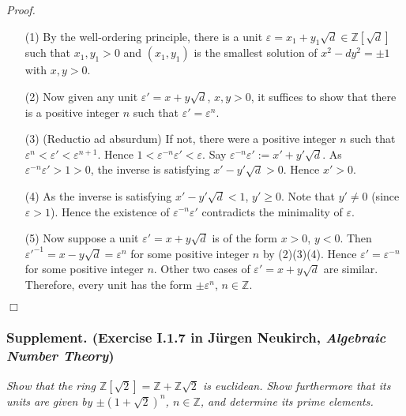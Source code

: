 \documentclass{article}
\begin{document}
\emph{Proof.}
\begin{enumerate}
\item[(1)]
  By the well-ordering principle,
  there is a unit $\varepsilon = x_1 + y_1\sqrt{d} \in \mathbb{Z}[\sqrt{d}]$ such that
  $x_1, y_1 > 0$ and $(x_1,y_1)$ is the smallest solution of $x^2 - dy^2 = \pm 1$ with $x, y > 0$.

\item[(2)]
  Now given any unit $\varepsilon' = x + y\sqrt{d}$, $x, y > 0$,
  it suffices to show that there is a positive integer $n$ such that $\varepsilon' = \varepsilon^n$.

\item[(3)]
  (Reductio ad absurdum)
  If not, there were a positive integer $n$ such that $\varepsilon^n < \varepsilon' < \varepsilon^{n+1}$.
  Hence $1 < \varepsilon^{-n} \varepsilon' < \varepsilon$.
  Say $\varepsilon^{-n} \varepsilon' := x' + y'\sqrt{d}$.
  As $\varepsilon^{-n} \varepsilon' > 1 > 0$, the inverse is satisfying $x' - y'\sqrt{d} > 0$.
  Hence $x' > 0$.

\item[(4)]
  As the inverse is satisfying $x' - y'\sqrt{d} < 1$, $y' \geq 0$.
  Note that $y' \neq 0$ (since $\varepsilon > 1$).
  Hence the existence of $\varepsilon^{-n} \varepsilon'$ contradicts the minimality of $\varepsilon$.

\item[(5)]
  Now suppose a unit $\varepsilon' = x + y\sqrt{d}$ is of the form $x > 0$, $y < 0$.
  Then $\varepsilon'^{-1} = x - y\sqrt{d} = \varepsilon^n$ for some positive integer $n$ by (2)(3)(4).
  Hence $\varepsilon' = \varepsilon^{-n}$ for some positive integer $n$.
  Other two cases of $\varepsilon' = x + y\sqrt{d}$ are similar.
  Therefore, every unit has the form $\pm \varepsilon^n$, $n \in \mathbb{Z}$.
\end{enumerate}
$\Box$ \\



\subsubsection*{Supplement. (Exercise I.1.7 in J\"urgen Neukirch, \emph{Algebraic Number Theory})}
\emph{Show that the ring $\mathbb{Z}[\sqrt{2}] = \mathbb{Z} + \mathbb{Z}\sqrt{2}$ is euclidean.
Show furthermore that its units are given by $\pm(1+\sqrt{2})^n$, $n \in \mathbb{Z}$,
and determine its prime elements.} \\
\end{document}
